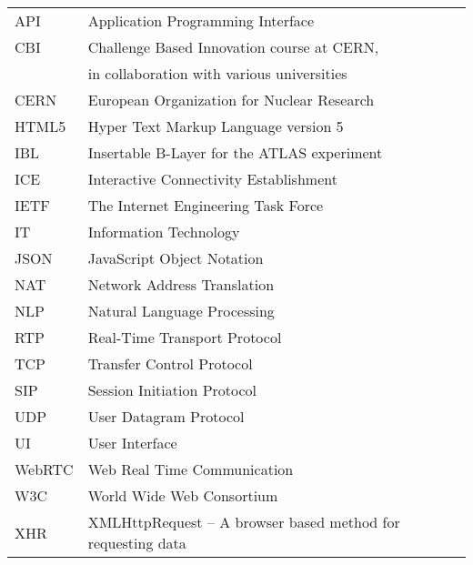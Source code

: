 \documentclass[english,12pt,a4paper,pdftex]{article}
\begin{document}


\tableofcontents


\begin{tabular}{ll}
API         & Application Programming Interface \\
CBI         & Challenge Based Innovation course at CERN,\\
            & in collaboration with various universities \\
CERN        & European Organization for Nuclear Research \\
HTML5       & Hyper Text Markup Language version 5 \\
IBL         & Insertable B-Layer for the ATLAS experiment \\
ICE         & Interactive Connectivity Establishment \\
IETF        & The Internet Engineering Task Force \\
IT          & Information Technology \\
JSON        & JavaScript Object Notation \\
NAT         & Network Address Translation \\
NLP         & Natural Language Processing \\
RTP         & Real-Time Transport Protocol \\
TCP         & Transfer Control Protocol \\ %
SIP         & Session Initiation Protocol \\
UDP         & User Datagram Protocol \\
UI          & User Interface \\
WebRTC      & Web Real Time Communication \\
W3C         & World Wide Web Consortium \\
XHR         & XMLHttpRequest -- A browser based method for requesting data
\end{tabular}


\cleardoublepage
\storeinipagenumber
{}
\setcounter{page}{1}
\end{document}
